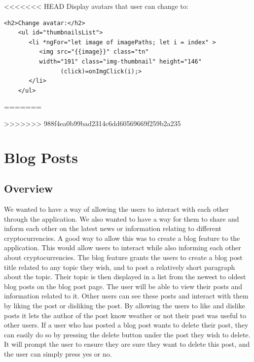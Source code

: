 <<<<<<< HEAD
Display avatars that user can change to:
\begin{lstlisting}
<h2>Change avatar:</h2>
    <ul id="thumbnailsList">
       <li *ngFor="let image of imagePaths; let i = index" >
          <img src="{{image}}" class="tn"
          width="191" class="img-thumbnail" height="146"  
                (click)=onImgClick(i);>
       </li>
    </ul>
\end{lstlisting}
=======

>>>>>>> 988f4ea0b99bad2314c6dd60569669f259b2a235

\section{Blog Posts}

\subsection{Overview}
We wanted to have a way of allowing the users to interact with each other through the application. We also wanted to have a way for them to share and inform each other on the latest news or information relating to different cryptocurrencies. A good way to allow this was to create a blog feature to the application. This would allow users to interact while also informing each other about cryptocurrencies. The blog feature grants the users to create a blog post title related to any topic they wish, and to post a relatively short paragraph about the topic. Their topic is then displayed in a list from the newest to oldest blog posts on the blog post page. The user will be able to view their posts and information related to it. Other users can see these posts and interact with them by liking the post or disliking the post. By allowing the users to like and dislike posts it lets the author of the post know weather or not their post was useful to other users. If a user who has posted a blog post wants to delete their post, they can easily do so by pressing the delete button under the post they wish to delete. It will prompt the user to ensure they are sure they want to delete this post, and the user can simply press yes or no.

